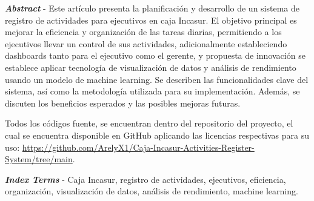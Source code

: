 \textbf{\textit{Abstract}} - Este artículo presenta la planificación y desarrollo de un sistema de registro de actividades para ejecutivos en caja Incasur. El objetivo principal es mejorar la eficiencia y organización de las tareas diarias, permitiendo a los ejecutivos llevar un control de sus actividades, adicionalmente estableciendo dashboards tanto para el ejecutivo como el gerente, y propuesta de innovación se establece aplicar tecnología de visualización de datos y análisis de rendimiento usando un modelo de machine learning. Se describen las funcionalidades clave del sistema, así como la metodología utilizada para su implementación. Además, se discuten los beneficios esperados y las posibles mejoras futuras.

Todos los códigos fuente, se encuentran dentro del repositorio del proyecto, el cual se encuentra disponible en GitHub aplicando las licencias respectivas para su uso: \url{https://github.com/ArelyX1/Caja-Incasur-Activities-Register-System/tree/main}.
\vspace{0.5em}

\textbf{\textit{Index Terms}} - Caja Incasur, registro de actividades, ejecutivos, eficiencia, organización, visualización de datos, análisis de rendimiento, machine learning.